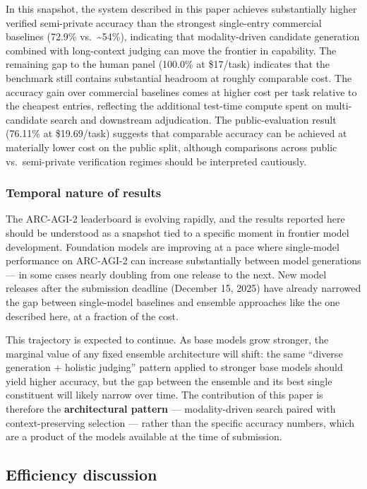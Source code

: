 \documentclass[11pt]{article}
\begin{document}
In this snapshot, the system described in this paper achieves
substantially higher verified semi-private accuracy than the strongest
single-entry commercial baselines (72.9\% vs.~\textasciitilde54\%),
indicating that modality-driven candidate generation combined with
long-context judging can move the frontier in capability. The remaining
gap to the human panel (100.0\% at \$17/task) indicates that the
benchmark still contains substantial headroom at roughly comparable
cost. The accuracy gain over commercial baselines comes at higher cost
per task relative to the cheapest entries, reflecting the additional
test-time compute spent on multi-candidate search and downstream
adjudication. The public-evaluation result (76.11\% at \$19.69/task)
suggests that comparable accuracy can be achieved at materially lower
cost on the public split, although comparisons across public
vs.~semi-private verification regimes should be interpreted cautiously.

\hypertarget{temporal-nature-of-results}{%
\subsubsection{Temporal nature of
results}\label{temporal-nature-of-results}}

The ARC-AGI-2 leaderboard is evolving rapidly, and the results reported
here should be understood as a snapshot tied to a specific moment in
frontier model development. Foundation models are improving at a pace
where single-model performance on ARC-AGI-2 can increase substantially
between model generations --- in some cases nearly doubling from one
release to the next. New model releases after the submission deadline
(December 15, 2025) have already narrowed the gap between single-model
baselines and ensemble approaches like the one described here, at a
fraction of the cost.

This trajectory is expected to continue. As base models grow stronger,
the marginal value of any fixed ensemble architecture will shift: the
same ``diverse generation + holistic judging'' pattern applied to
stronger base models should yield higher accuracy, but the gap between
the ensemble and its best single constituent will likely narrow over
time. The contribution of this paper is therefore the
\textbf{architectural pattern} --- modality-driven search paired with
context-preserving selection --- rather than the specific accuracy
numbers, which are a product of the models available at the time of
submission.

\hypertarget{efficiency-discussion}{%
\subsection{Efficiency discussion}\label{efficiency-discussion}}
\end{document}

